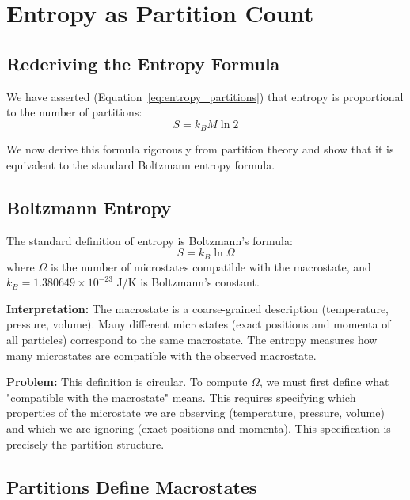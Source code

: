 \documentclass[twocolumn,10pt]{article}
\theoremstyle{definition}
\theoremstyle{remark}
\begin{document}
\section{Entropy as Partition Count}
\label{sec:entropy}

\subsection{Rederiving the Entropy Formula}

We have asserted (Equation~\ref{eq:entropy_partitions}) that entropy is proportional to the number of partitions:
\begin{equation}
S = k_B M \ln 2
\end{equation}

We now derive this formula rigorously from partition theory and show that it is equivalent to the standard Boltzmann entropy formula.

\subsection{Boltzmann Entropy}

The standard definition of entropy is Boltzmann's formula\cite{boltzmann1877}:
\begin{equation}
\label{eq:boltzmann_entropy}
S = k_B \ln \Omega
\end{equation}
where $\Omega$ is the number of microstates compatible with the macrostate, and $k_B = 1.380649 \times 10^{-23}$ J/K is Boltzmann's constant.

\vspace{0.2cm}
\noindent\textbf{Interpretation:} The macrostate is a coarse-grained description (temperature, pressure, volume). Many different microstates (exact positions and momenta of all particles) correspond to the same macrostate. The entropy measures how many microstates are compatible with the observed macrostate.

\vspace{0.2cm}
\noindent\textbf{Problem:} This definition is circular. To compute $\Omega$, we must first define what "compatible with the macrostate" means. This requires specifying which properties of the microstate we are observing (temperature, pressure, volume) and which we are ignoring (exact positions and momenta). This specification is precisely the partition structure.

\subsection{Partitions Define Macrostates}
\end{document}
